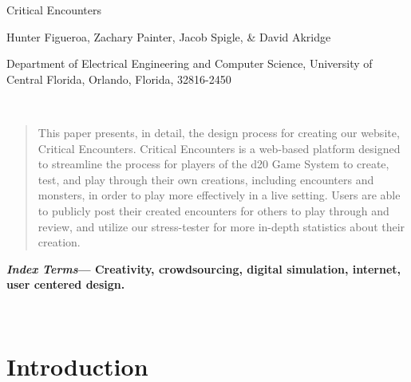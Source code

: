 \documentclass[letterpaper, 10 pt, conference]{ieeeconf}
\begin{document}
\begin{center}
	\huge Critical Encounters
	
	\large Hunter Figueroa, Zachary Painter, Jacob Spigle, \& David Akridge
	
	\large Department of Electrical Engineering and Computer Science, University of Central Florida, Orlando, Florida, 32816-2450
\end{center}

\

\begin{abstract}
	This paper presents, in detail, the design process for creating our website, Critical Encounters. Critical Encounters is a web-based platform designed to streamline the process
	for players of the d20 Game System to create, test, and play through their own
	creations, including encounters and monsters, in order to play more effectively
	in a live setting. Users are able to publicly post their created encounters for
	others to play through and review, and utilize our stress-tester for more in-depth
	statistics about their creation.
\end{abstract}

\small \textbf{\textit{Index Terms}--- Creativity, crowdsourcing, digital simulation, internet, user centered design.}

\

\section{Introduction}
\end{document}
